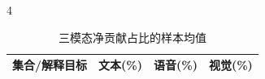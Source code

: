 \begin{PaperTable}{4}

\begin{table}[!htbp]
\centering\caption{三模态净贡献占比的样本均值\label{q3-tab14}}
\begin{tabular}{@{}llll@{}}
\toprule
\begin{minipage}[b]{\dimexpr 0.460000\linewidth-2.760000\tabcolsep\relax}\raggedright
集合/解释目标\strut
\end{minipage} & \begin{minipage}[b]{\dimexpr 0.180000\linewidth-1.080000\tabcolsep\relax}\raggedleft
文本(\%)\strut
\end{minipage} & \begin{minipage}[b]{\dimexpr 0.180000\linewidth-1.080000\tabcolsep\relax}\raggedleft
语音(\%)\strut
\end{minipage} & \begin{minipage}[b]{\dimexpr 0.180000\linewidth-1.080000\tabcolsep\relax}\raggedleft
视觉(\%)\strut
\end{minipage}\tabularnewline
\midrule


\end{tabular}
\end{table}
\end{PaperTable}
